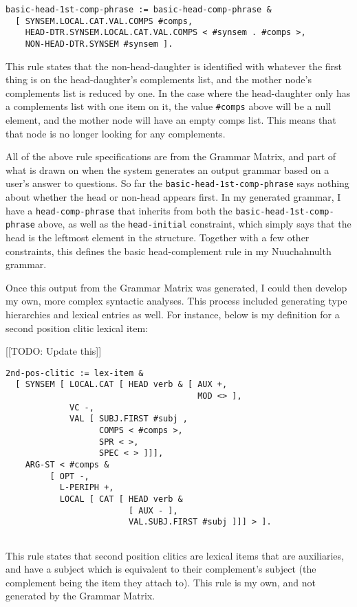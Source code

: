 \begin{verbatim}
basic-head-1st-comp-phrase := basic-head-comp-phrase &
  [ SYNSEM.LOCAL.CAT.VAL.COMPS #comps,
    HEAD-DTR.SYNSEM.LOCAL.CAT.VAL.COMPS < #synsem . #comps >,
    NON-HEAD-DTR.SYNSEM #synsem ].
\end{verbatim}

\noindent This rule states that the non-head-daughter is identified with whatever the first thing is on the head-daughter's complements list, and the mother node's complements list is reduced by one. In the case where the head-daughter only has a complements list with one item on it, the value \texttt{\#comps} above will be a null element, and the mother node will have an empty comps list. This means that that node is no longer looking for any complements.

All of the above rule specifications are from the Grammar Matrix, and part of what is drawn on when the system generates an output grammar based on a user's answer to questions. So far the \texttt{basic-head-1st-comp-phrase} says nothing about whether the head or non-head appears first. In my generated grammar, I have a \texttt{head-comp-phrase} that inherits from both the \texttt{basic-head-1st-comp-phrase} above, as well as the \texttt{head-initial} constraint, which simply says that the head is the leftmost element in the structure. Together with a few other constraints, this defines the basic head-complement rule in my Nuuchahnulth grammar.

Once this output from the Grammar Matrix was generated, I could then develop my own, more complex syntactic analyses. This process included generating type hierarchies and lexical entries as well. For instance, below is my definition for a second position clitic lexical item:

[[TODO: Update this]]

\begin{verbatim}
2nd-pos-clitic := lex-item &
  [ SYNSEM [ LOCAL.CAT [ HEAD verb & [ AUX +,
				                       MOD <> ],
             VC -,
             VAL [ SUBJ.FIRST #subj ,
                   COMPS < #comps >,
                   SPR < >,
                   SPEC < > ]]],
    ARG-ST < #comps &
         [ OPT -,
           L-PERIPH +,
           LOCAL [ CAT [ HEAD verb &
                         [ AUX - ],
                         VAL.SUBJ.FIRST #subj ]]] > ].
	
\end{verbatim}

\noindent This rule states that second position clitics are lexical items that are auxiliaries, and have a subject which is equivalent to their complement's subject (the complement being the item they attach to). This rule is my own, and not generated by the Grammar Matrix.

